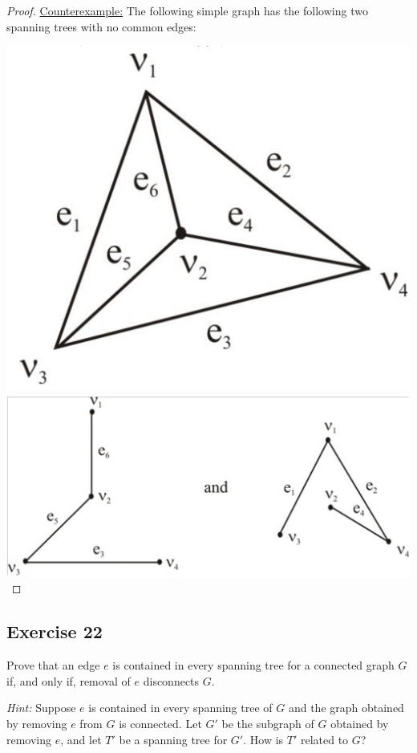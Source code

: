 \documentclass[14pt]{extarticle}
\begin{document}
\begin{proof}
    \underline{Counterexample:} The following simple graph has the following two spanning trees with no common edges:

    \includegraphics[scale=0.15]{../images/10.6.21.b.1.png}
    \includegraphics[scale=0.25]{../images/10.6.21.b.2.png}
\end{proof}

\subsection{Exercise 22}
Prove that an edge \(e\) is contained in every spanning tree for a connected graph \(G\) if, and only if, removal of \(e\)
disconnects \(G\).

    {\it Hint:} Suppose \(e\) is contained in every spanning tree of \(G\) and the graph obtained by removing \(e\) from \(G\)
is connected. Let \(G'\) be the subgraph of \(G\) obtained by removing \(e\), and let \(T'\) be a spanning tree for \(G'\).
How is \(T'\) related to \(G\)?
\end{document}
